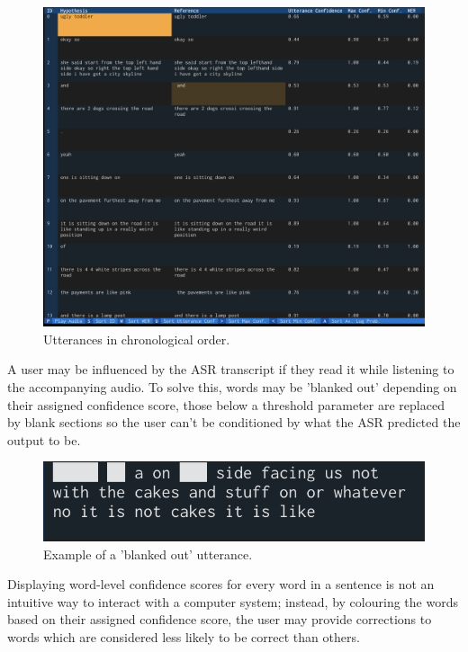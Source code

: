 \begin{figure}[H]
  \centering
  \includegraphics[width=\textwidth]{images/chronological-order.png}
  \caption{Utterances in chronological order.}
  \label{fig:sys-chronological}
\end{figure}

A user may be influenced by the ASR transcript if they read it while listening to the accompanying audio.
To solve this, words may be 'blanked out' depending on their assigned confidence score, those below a threshold parameter are replaced by blank sections so the user can't be conditioned by what the ASR predicted the output to be.

\begin{figure}[H]
  \centering
  \includegraphics[width=\textwidth]{images/text-blanking.png}
  \caption{Example of a 'blanked out' utterance.}
  \label{fig:sys-blanking}
\end{figure}

Displaying word-level confidence scores for every word in a sentence is not an intuitive way to interact with a computer system; instead, by colouring the words based on their assigned confidence score, the user may provide corrections to words which are considered less likely to be correct than others.

